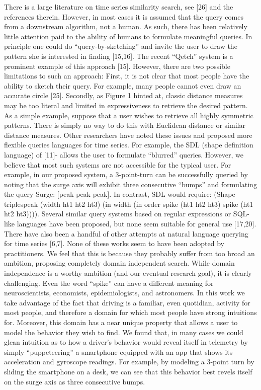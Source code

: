 There is a large literature on time series similarity search, see [26] and the references therein. However, in most cases it is assumed that the query comes from a downstream algorithm, not a human. As such, there has been relatively little attention paid to the ability of humans to formulate meaningful queries. In principle one could do “query-by-sketching” and invite the user to draw the pattern she is interested in finding [15,16]. The recent “Qetch” system is a prominent example of this approach [15]. However, there are two possible limitations to such an approach: First, it is not clear that most people have the ability to sketch their query. For example, many people cannot even draw an accurate circle [25]. Secondly, as Figure 1 hinted at, classic distance measures may be too literal and limited in expressiveness to retrieve the desired pattern. As a simple example, suppose that a user wishes to retrieve all highly symmetric patterns. There is simply no way to do this with Euclidean distance or similar distance measures.
Other researchers have noted these issues and proposed more flexible queries languages for time series. For example, the SDL (shape definition language) of [11]- allows the user to formulate “blurred” queries. However, we believe that most such systems are not accessible for the typical user. For example, in our proposed system, a 3-point-turn can be successfully queried by noting that the surge axis will exhibit three consecutive “bumps” and formulating the query Surge: [peak peak peak]. In contrast, SDL would require: 
(Shape triplespeak (width ht1 ht2 ht3) (in width (in order spike (ht1 ht2 ht3) spike (ht1 ht2 ht3)))). 
Several similar query systems based on regular expressions or SQL-like languages have been proposed, but none seem suitable for general use [17,20].	
There have also been a handful of other attempts at natural language querying for time series [6,7]. None of these works seem to have been adopted by practitioners. We feel that this is because they probably suffer from too broad an ambition, proposing completely domain independent search.  While domain independence is a worthy ambition (and our eventual research goal), it is clearly challenging. Even the word “spike” can have a different meaning for neuroscientists, economists, epidemiologists, and astronomers. In this work we take advantage of the fact that driving is a familiar, even quotidian, activity for most people, and therefore a domain for which most people have strong intuitions for. Moreover, this domain has a near unique property that allows a user to model the behavior they wish to find. We found that, in many cases we could glean intuition as to how a driver’s behavior would reveal itself in telemetry by simply “puppeteering” a smartphone equipped with an app that shows its acceleration and gyroscope readings. For example, by modeling a 3-point turn by sliding the smartphone on a desk, we can see that this behavior best revels itself on the surge axis as three consecutive bumps.

